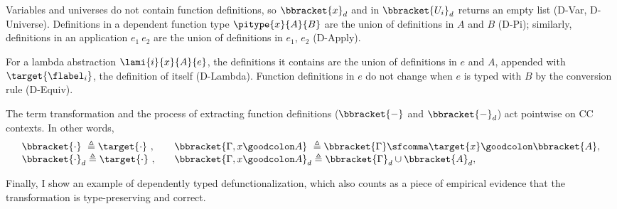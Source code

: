 Variables and universes do not contain function definitions, so $\bbracket{x}_d$ and in $\bbracket{U_i}_d$ returns an empty list (D-Var, D-Universe). Definitions in a dependent function type $\pitype{x}{A}{B}$ are the union of definitions in $A$ and $B$ (D-Pi); similarly, definitions in an application $e_1\ e_2$ are the union of definitions in $e_1$, $e_2$ (D-Apply). 

For a lambda abstraction $\lami{i}{x}{A}{e}$, the definitions it contains are the union of definitions in $e$ and $A$, appended with $\target{\flabel_i}$, the definition of itself (D-Lambda). Function definitions in $e$ do not change when $e$ is typed with $B$ by the conversion rule (D-Equiv).

The term transformation and the process of extracting function definitions ($\bbracket{-}$ and $\bbracket{-}_d$) act pointwise on CC contexts. In other words,
\begin{equation*}
\begin{array}{l @{\qquad} l}
	\bbracket{\cdot}\ \triangleq \target{\cdot}\ , & \bbracket{\Gamma, x \goodcolon A}\ \triangleq \bbracket{\Gamma}\sfcomma \target{x} \goodcolon \bbracket{A},\\
	\bbracket{\cdot}_d \triangleq \target{\cdot}\ , & \bbracket{\Gamma, x \goodcolon A}_d \triangleq \bbracket{\Gamma}_d\cup\bbracket{A}_d,\\
\end{array}
\end{equation*}

Finally, I show an example of dependently typed defunctionalization, which also counts as a piece of empirical evidence that the transformation is type-preserving and correct.

